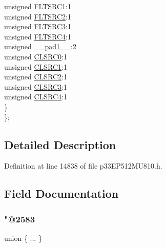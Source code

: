 \begin{DoxyCompactItemize}
\begin{tabbing}
\>\>unsigned \hyperlink{structtag_f_c_l_c_o_n4_b_i_t_s_a7e2dde44582a2b4411afb97f93704738}{FLTSRC1}:1\\
\>\>unsigned \hyperlink{structtag_f_c_l_c_o_n4_b_i_t_s_a41a56979130beaf62e52443409af0daf}{FLTSRC2}:1\\
\>\>unsigned \hyperlink{structtag_f_c_l_c_o_n4_b_i_t_s_a919f99b1241a5f4d92f40778ec6b91a8}{FLTSRC3}:1\\
\>\>unsigned \hyperlink{structtag_f_c_l_c_o_n4_b_i_t_s_afedaf58b1e4d19481bb47b44b59ecbc3}{FLTSRC4}:1\\
\>\>unsigned \hyperlink{structtag_f_c_l_c_o_n4_b_i_t_s_acaf2d0924a107ec6e8d2e31febaf66f9}{\_\_pad1\_\_}:2\\
\>\>unsigned \hyperlink{structtag_f_c_l_c_o_n4_b_i_t_s_a0a945873cb44d41b241b83b08b599880}{CLSRC0}:1\\
\>\>unsigned \hyperlink{structtag_f_c_l_c_o_n4_b_i_t_s_a59f38630bf59c0035792456d75d03410}{CLSRC1}:1\\
\>\>unsigned \hyperlink{structtag_f_c_l_c_o_n4_b_i_t_s_a24cd8f779980ba4b721ab1d0d63648de}{CLSRC2}:1\\
\>\>unsigned \hyperlink{structtag_f_c_l_c_o_n4_b_i_t_s_a86b531e28879dfb3db317ce2147d381e}{CLSRC3}:1\\
\>\>unsigned \hyperlink{structtag_f_c_l_c_o_n4_b_i_t_s_a438bb199cbcc62bfd380ead48036accc}{CLSRC4}:1\\
\>\} \\
\}; \\

\end{tabbing}\end{DoxyCompactItemize}


\subsection{Detailed Description}


Definition at line 14838 of file p33\+E\+P512\+M\+U810.\+h.



\subsection{Field Documentation}
\mbox{\label{structtag_f_c_l_c_o_n4_b_i_t_s_aedfa7cbcf4d6db5d8c41194a74cd3ad7}} 
\subsubsection{\texorpdfstring{"@2583}{@2583}}
{\footnotesize\ttfamily union \{ ... \} }

